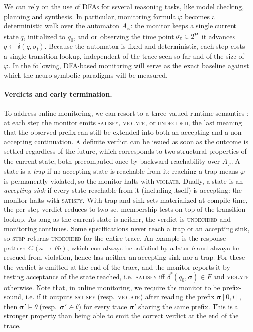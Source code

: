 We can rely on the use of DFAs for several reasoning tasks, like model checking, planning and synthesis. In particular, monitoring formula $\varphi$ becomes a deterministic walk over the automaton $A_\varphi$: the monitor keeps a single current state $q$, initialized to $q_0$, and on observing the time point $\sigma_t \in 2^{\mathcal{P}}$ it advances $q \leftarrow \delta(q, \sigma_t)$. Because the automaton is fixed and deterministic, each step costs a single transition lookup, independent of the trace seen so far and of the size of $\varphi$. In the following, DFA-based monitoring will serve as the exact baseline against which the neuro-symbolic paradigms will be measured.


\paragraph{Verdicts and early termination.}
To address online monitoring, we can resort to a three-valued runtime semantics \cite{monitorability_LTL}: at each step the monitor emits \textsc{satisfy}, \textsc{violate}, or \textsc{undecided}, the last meaning that the observed prefix can still be extended into both an accepting and a non-accepting continuation. A definite verdict can be issued as soon as the outcome is settled regardless of the future, which corresponds to two structural properties of the current state, both precomputed once by backward reachability over $A_\varphi$. A state is a \emph{trap} if no accepting state is reachable from it: reaching a trap means $\varphi$ is permanently violated, so the monitor halts with \textsc{violate}. Dually, a state is an \emph{accepting sink} if every state reachable from it (including itself) is accepting: the monitor halts with \textsc{satisfy}. With trap and sink sets materialized at compile time, the per-step verdict reduces to two set-membership tests on top of the transition lookup. As long as the current state is neither, the verdict is \textsc{undecided} and monitoring continues.
Some specifications never reach a trap or an accepting sink, so \textsc{step} returns \textsc{undecided} for the entire trace. An example is the response pattern $G(a \rightarrow Fb)$, which can always be satisfied by a later $b$ and always be rescued from violation, hence has neither an accepting sink nor a trap. For these the verdict is emitted at the end of the trace, and the monitor reports it by testing acceptance of the state reached, i.e.\ \textsc{satisfy} iff $\delta^*(q_0, \boldsymbol{\sigma}) \in F$ and \textsc{violate} otherwise. Note that, in online monitoring, we require the monitor to be prefix-sound, i.e. if it
outputs \textsc{satisfy} (resp.\ \textsc{violate}) after reading the prefix $\boldsymbol{\sigma}[0,t]$, then
$\boldsymbol{\sigma}'\models\theta$ (resp.\ $\boldsymbol{\sigma}'\not\models\theta$)
for every trace $\boldsymbol{\sigma}'$ sharing the same prefix.
This is a stronger property than being able to emit the correct verdict at the end of the trace.